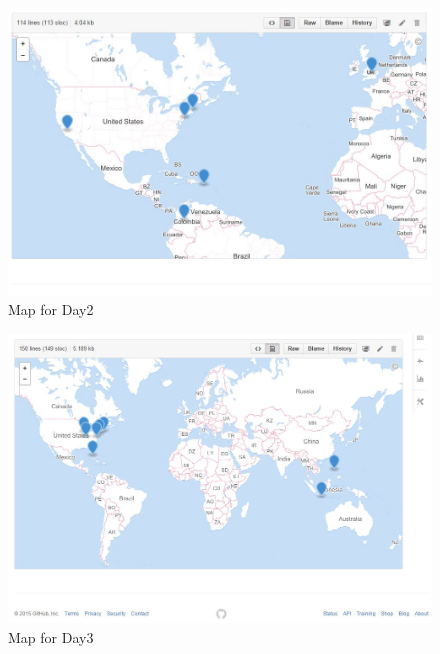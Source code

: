 \begin{figure}[ht]
	\begin{center}
		 \includegraphics[scale=0.60]{geo2}
		  \caption{Map for Day2}
	 \end{center}
\end{figure}
\begin{figure}[ht]
	\begin{center}
		 \includegraphics[scale=0.60]{geo3}
		  \caption{Map for Day3}
	 \end{center}
\end{figure}
